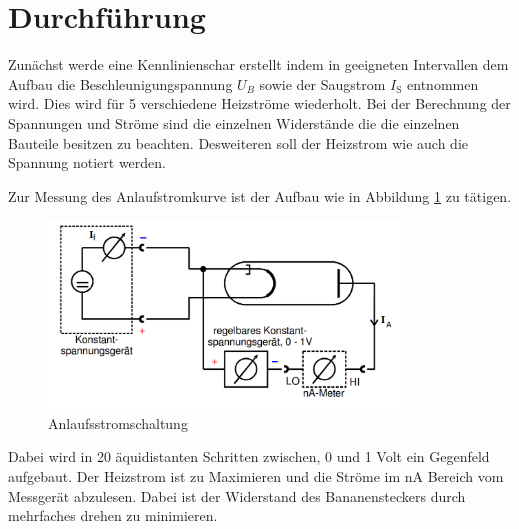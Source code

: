 \section{Durchführung}
\label{sec:Durchführung}
Zunächst werde eine Kennlinienschar erstellt indem in geeigneten Intervallen dem Aufbau die Beschleunigungspannung $U_B$ sowie der Saugstrom $I_\text{S}$ entnommen wird. Dies wird für 5 verschiedene Heizströme wiederholt. Bei der Berechnung der Spannungen und Ströme sind die einzelnen Widerstände die die einzelnen Bauteile besitzen zu beachten. Desweiteren soll der Heizstrom wie auch die Spannung notiert werden.

Zur Messung des Anlaufstromkurve ist der Aufbau wie in Abbildung \ref{fig:Anl} zu tätigen.
\begin{figure}
  \centering
  \includegraphics[height=5cm]{picture/Gegenfeld.png}
  \caption{Anlaufsstromschaltung \cite{pra}}
  \label{fig:Anl}
\end{figure}
Dabei wird in 20 äquidistanten Schritten zwischen, 0 und 1 Volt ein Gegenfeld aufgebaut. Der Heizstrom ist zu Maximieren und die Ströme im nA Bereich vom Messgerät abzulesen. Dabei ist der Widerstand des Bananensteckers durch mehrfaches drehen zu minimieren.
\newpage
